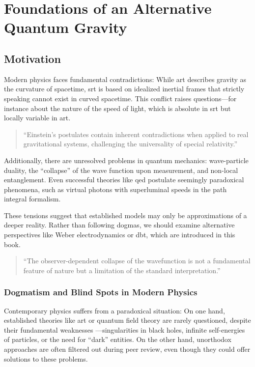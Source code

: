 \chapter{Foundations of an Alternative Quantum Gravity}
\section{Motivation}
Modern physics faces fundamental contradictions: While \gls{art} describes gravity as the curvature of spacetime, \gls{srt} is based on idealized inertial frames
that strictly speaking cannot exist in curved spacetime. This conflict raises questions—for instance about the nature of the speed of light, which is absolute in \gls{srt} but
locally variable in \gls{art}.
\begin{quote}
    \enquote{Einstein's postulates contain inherent contradictions when applied to real gravitational systems, challenging the universality of special relativity.} \cite{Rubcic1998}
\end{quote}
Additionally, there are unresolved problems in quantum mechanics: wave-particle duality, the \enquote{collapse} of the wave function upon measurement, and non-local entanglement. Even successful
theories like \gls{qed} postulate seemingly paradoxical phenomena, such as virtual photons with superluminal speeds in the path integral formalism.

These tensions suggest that established models may only be approximations of a deeper reality. Rather than following dogmas, we should examine alternative perspectives
like Weber electrodynamics or \gls{dbt}, which are introduced in this book.
\begin{quote}
    \enquote{The observer-dependent collapse of the wavefunction is not a fundamental feature of nature but a limitation of the standard interpretation.} \cite{bohm1952}
\end{quote}

\subsection{Dogmatism and Blind Spots in Modern Physics}
Contemporary physics suffers from a paradoxical situation: On one hand, established theories like \gls{art} or quantum field theory are rarely questioned, despite their fundamental weaknesses
—singularities in black holes, infinite self-energies of particles, or the need for \enquote{dark} entities. On the other hand, unorthodox approaches are often filtered out during peer review,
even though they could offer solutions to these problems.

